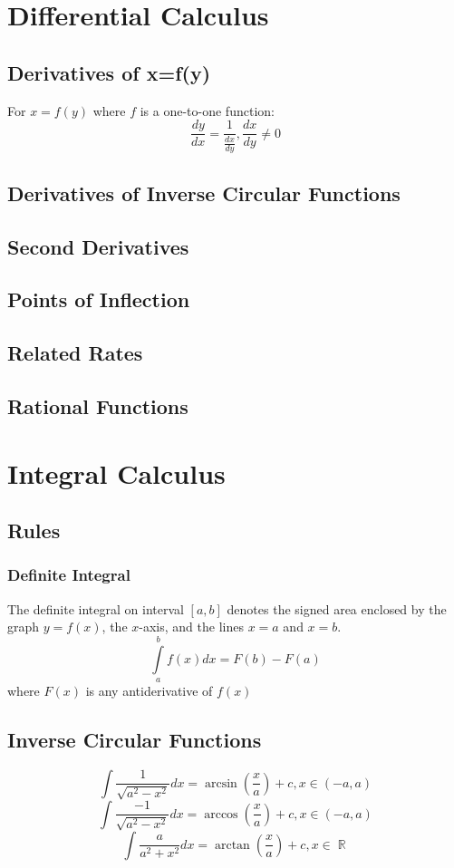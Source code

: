 \documentclass[a4paper,twoside,10pt]{article}
\DeclareMathOperator\R{\mathbb{R}}
\begin{document}
	\section{Differential Calculus}			
		\subsection{Derivatives of x=f(y)}
			For $x=f(y)$ where $f$ is a one-to-one function:
			\[
				\frac{dy}{dx}=\frac{1}{\frac{dx}{dy}},\frac{dx}{dy}\neq0
			\]
		\subsection{Derivatives of Inverse Circular Functions}
		\subsection{Second Derivatives}
		\subsection{Points of Inflection}
		\subsection{Related Rates}
		\subsection{Rational Functions}
	\section{Integral Calculus}
		\subsection{Rules}
			\subsubsection{Definite Integral}
				The definite integral on interval $[a,b]$ denotes the signed area enclosed by the graph $y=f(x)$, the $x$-axis, and the lines $x=a$ and $x=b$.
				\[
					\int\limits_{a}^{b}f(x)dx=F(b)-F(a)
				\]
				where $F(x)$ is any antiderivative of $f(x)$
		\subsection{Inverse Circular Functions}
			\[
				\int\frac{1}{\sqrt{a^2-x^2}}dx=\arcsin\left(\frac{x}{a}\right)+c,x\in(-a,a)
			\]
			\[
				\int\frac{-1}{\sqrt{a^2-x^2}}dx=\arccos\left(\frac{x}{a}\right)+c,x\in(-a,a)
			\]
			\[
				\int\frac{a}{a^2+x^2}dx=\arctan\left(\frac{x}{a}\right)+c,x\in\R
			\]
\end{document}
